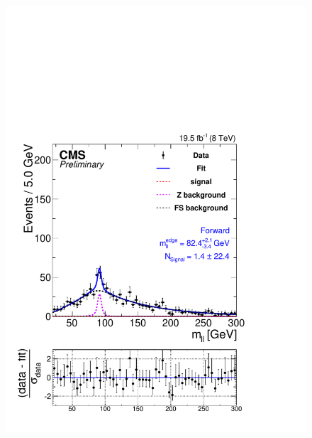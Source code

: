 \begin{figure}[hbp]
\begin{minipage}[t]{0.49\textwidth}
    \includegraphics[width=\textwidth]{plots/results/fit/fit2012_ETHTriangle_SignalInclusive_Combined_Full2012_ETHTriangle_Forward.pdf}
  \end{minipage}
  \begin{minipage}[t]{0.49\textwidth}

\end{minipage}
\end{figure}
